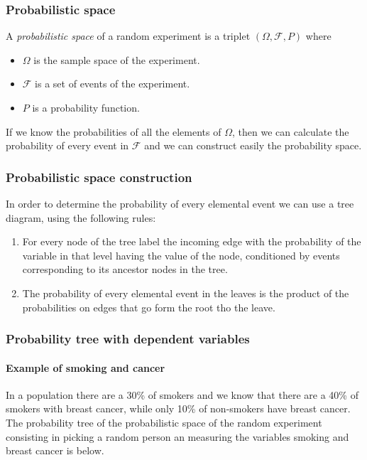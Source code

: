 \begin{frame}
\frametitle{Probabilistic space}
\begin{definition}
A \emph{probabilistic space} of a random experiment is a triplet $(\Omega,\mathcal{F},P)$ where
\begin{itemize}
\item $\Omega$ is the sample space of the experiment.
\item $\mathcal{F}$ is a set of events of the experiment.
\item $P$ is a probability function. 
\end{itemize} 
\end{definition}

If we know the probabilities of all the elements of $\Omega$, then we can calculate the probability of every event in
$\mathcal{F}$ and we can construct easily the probability space. 
\end{frame}


\begin{frame}
\frametitle{Probabilistic space construction}
In order to determine the probability of every elemental event we can use a tree diagram, using the following rules:
\begin{enumerate}
\item For every node of the tree label the incoming edge with the probability of the variable in that level having the
value of the node, conditioned by events corresponding to its ancestor nodes in the tree.
\item The probability of every elemental event in the leaves is the product of the probabilities on edges
that go form the root tho the leave.
\end{enumerate}
\begin{center}
\resizebox{0.9\textwidth}{!}{}
\end{center}
\end{frame}


\begin{frame}
\frametitle{Probability tree with dependent variables}
\framesubtitle{Example of smoking and cancer}
In a population there are a 30\% of smokers and we know that there are a 40\% of smokers with breast cancer, while only
10\% of non-smokers have breast cancer. 
The probability tree of the probabilistic space of the random experiment consisting in picking a random person an
measuring the variables smoking and breast cancer is below.  
\begin{center}
\resizebox{0.8\textwidth}{!}{}
\end{center}
\end{frame}


